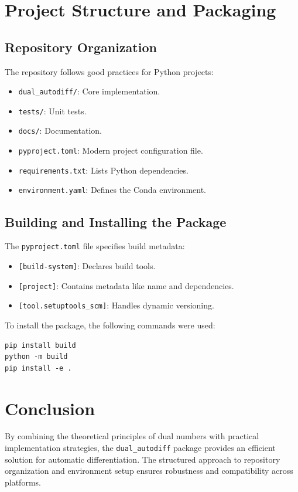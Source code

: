 \documentclass[a4paper,12pt]{article}
\begin{document}
\section{Project Structure and Packaging}

\subsection{Repository Organization}
The repository follows good practices for Python projects:
\begin{itemize}
    \item \texttt{dual\_autodiff/}: Core implementation.
    \item \texttt{tests/}: Unit tests.
    \item \texttt{docs/}: Documentation.
    \item \texttt{pyproject.toml}: Modern project configuration file.
    \item \texttt{requirements.txt}: Lists Python dependencies.
    \item \texttt{environment.yaml}: Defines the Conda environment.
\end{itemize}

\subsection{Building and Installing the Package}
The \texttt{pyproject.toml} file specifies build metadata:
\begin{itemize}
    \item \texttt{[build-system]}: Declares build tools.
    \item \texttt{[project]}: Contains metadata like name and dependencies.
    \item \texttt{[tool.setuptools\_scm]}: Handles dynamic versioning.
\end{itemize}

To install the package, the following commands were used:
\begin{verbatim}
pip install build
python -m build
pip install -e .
\end{verbatim}

\section{Conclusion}
By combining the theoretical principles of dual numbers with practical implementation strategies, the \texttt{dual\_autodiff} package provides an efficient solution for automatic differentiation. The structured approach to repository organization and environment setup ensures robustness and compatibility across platforms.

\printbibliography
\end{document}
